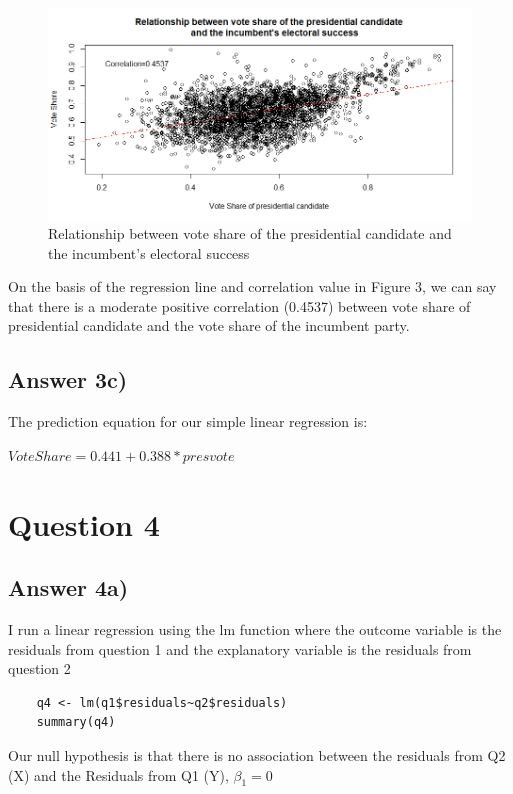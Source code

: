 \documentclass{article}
\begin{document}
\begin{figure}[h!] %
    \centering
    \includegraphics[width=1.3\textwidth]{Q3PS3.png}
    \caption{Relationship between vote share of the presidential candidate
     and the incumbent's electoral success}
    \label{}
\end{figure}
On the basis of the regression line and correlation value in Figure 3, we can say that there is a moderate positive correlation (0.4537) between vote share of presidential candidate and the vote share of the incumbent party.

\subsection{Answer 3c)}
The prediction equation for our simple linear regression is:

\begin{math}
    Vote Share = 0.441 + 0.388 * presvote 
\end{math}

\section{Question 4}
\subsection{Answer 4a)}
I run a linear regression using the lm function where the outcome variable is the residuals from question 1 and the explanatory variable is the residuals from question 2
\begin{verbatim}
    q4 <- lm(q1$residuals~q2$residuals)
    summary(q4)
\end{verbatim}

Our null hypothesis is that there is no association between the residuals from Q2 (X) and the Residuals from Q1 (Y), $\beta_1 = 0$
\end{document}
